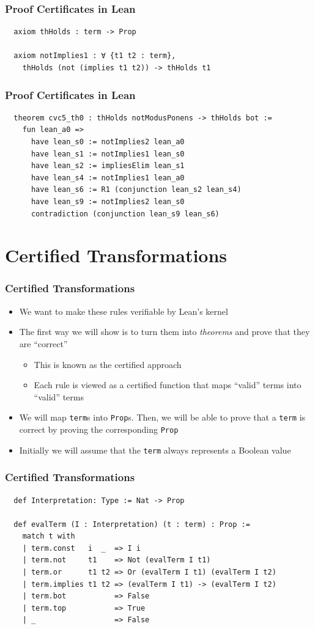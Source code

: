 \documentclass[usepdftitle=false,aspectratio=169,usenames,dvipsnames]{beamer}
\newcommand\vitem{\vfill\item}
\begin{document}
\begin{frame}[fragile]
  \frametitle{Proof Certificates in Lean}
  \begin{verbatim}
  axiom thHolds : term -> Prop

  axiom notImplies1 : ∀ {t1 t2 : term},
    thHolds (not (implies t1 t2)) -> thHolds t1
  \end{verbatim}
\end{frame}

\begin{frame}[fragile]
  \frametitle{Proof Certificates in Lean}
  \begin{verbatim}
  theorem cvc5_th0 : thHolds notModusPonens -> thHolds bot :=
    fun lean_a0 =>
      have lean_s0 := notImplies2 lean_a0
      have lean_s1 := notImplies1 lean_s0
      have lean_s2 := impliesElim lean_s1
      have lean_s4 := notImplies1 lean_a0
      have lean_s6 := R1 (conjunction lean_s2 lean_s4)
      have lean_s9 := notImplies2 lean_s0
      contradiction (conjunction lean_s9 lean_s6)
  \end{verbatim}
\end{frame}

\section{Certified Transformations}

\begin{frame}
  \frametitle{Certified Transformations}
  \begin{itemize}
    \item We want to make these rules verifiable by Lean's kernel
    \vitem The first way we will show is to turn them into \textit{theorems} and prove that they are ``correct''
    \begin{itemize}
      \item This is known as the certified approach
      \item Each rule is viewed as a certified function that maps ``valid'' terms into ``valid'' terms
    \end{itemize}
    \vitem We will map \texttt{term}s into \texttt{Prop}s. Then, we will be able to prove that a \texttt{term} is correct by proving the corresponding \texttt{Prop}
    \vitem Initially we will assume that the \texttt{term} always represents a Boolean value
  \end{itemize}
\end{frame}

\begin{frame}[fragile]
  \frametitle{Certified Transformations}
  \begin{verbatim}
  def Interpretation: Type := Nat -> Prop

  def evalTerm (I : Interpretation) (t : term) : Prop :=
    match t with
    | term.const   i  _  => I i
    | term.not     t1    => Not (evalTerm I t1)
    | term.or      t1 t2 => Or (evalTerm I t1) (evalTerm I t2)
    | term.implies t1 t2 => (evalTerm I t1) -> (evalTerm I t2)
    | term.bot           => False
    | term.top           => True
    | _                  => False
  \end{verbatim}
\end{frame}
\end{document}
